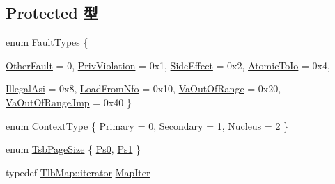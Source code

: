 \subsection*{Protected 型}
\begin{DoxyCompactItemize}
\item 
enum \hyperlink{classSparcISA_1_1TLB_a8e661b580d73f1e008c8ea6fc5823822}{FaultTypes} \{ \par
\hyperlink{classSparcISA_1_1TLB_a8e661b580d73f1e008c8ea6fc5823822ad787a45173579300e6a023f2de7291af}{OtherFault} =  0, 
\hyperlink{classSparcISA_1_1TLB_a8e661b580d73f1e008c8ea6fc5823822afdc36f7178e8d04d90ec745400f5d5e7}{PrivViolation} =  0x1, 
\hyperlink{classSparcISA_1_1TLB_a8e661b580d73f1e008c8ea6fc5823822a24949c2da237f4437ec8254b313fa9e1}{SideEffect} =  0x2, 
\hyperlink{classSparcISA_1_1TLB_a8e661b580d73f1e008c8ea6fc5823822a385d55ed81ad94372aeb0ca764c50bb8}{AtomicToIo} =  0x4, 
\par
\hyperlink{classSparcISA_1_1TLB_a8e661b580d73f1e008c8ea6fc5823822a15e185ce6e96161d3b8cd69c4e404c14}{IllegalAsi} =  0x8, 
\hyperlink{classSparcISA_1_1TLB_a8e661b580d73f1e008c8ea6fc5823822a95f50e219a840e80a9a1915b7f8b959d}{LoadFromNfo} =  0x10, 
\hyperlink{classSparcISA_1_1TLB_a8e661b580d73f1e008c8ea6fc5823822a218b85059c614ecbbee4628b16ff49da}{VaOutOfRange} =  0x20, 
\hyperlink{classSparcISA_1_1TLB_a8e661b580d73f1e008c8ea6fc5823822a6b3372addb0e74f2071f8e2ae4402676}{VaOutOfRangeJmp} =  0x40
 \}
\item 
enum \hyperlink{classSparcISA_1_1TLB_a856bf0f48d7d9c89d1e4216a6f0394e5}{ContextType} \{ \hyperlink{classSparcISA_1_1TLB_a856bf0f48d7d9c89d1e4216a6f0394e5a35c33effed98e564ad1bd10ef61d302c}{Primary} =  0, 
\hyperlink{classSparcISA_1_1TLB_a856bf0f48d7d9c89d1e4216a6f0394e5acdd030c6485c7b0801d32116fd9d7103}{Secondary} =  1, 
\hyperlink{classSparcISA_1_1TLB_a856bf0f48d7d9c89d1e4216a6f0394e5af5d1689599ccf08b174b36cfd0c3b6c7}{Nucleus} =  2
 \}
\item 
enum \hyperlink{classSparcISA_1_1TLB_a639a136c8fa30e45275bd7354e95eadd}{TsbPageSize} \{ \hyperlink{classSparcISA_1_1TLB_a639a136c8fa30e45275bd7354e95eadda3a7edc18be042f9f093c3c4fd03b6048}{Ps0}, 
\hyperlink{classSparcISA_1_1TLB_a639a136c8fa30e45275bd7354e95eadda0955a6897849c661b0454ad02ad7f033}{Ps1}
 \}
\item 
typedef \hyperlink{classSparcISA_1_1TlbMap_ae61c5513b9ac04615ba7927f47c3ec69}{TlbMap::iterator} \hyperlink{classSparcISA_1_1TLB_a52ffc8e6c7bc8d7037f59391c2a93750}{MapIter}
\end{DoxyCompactItemize}
